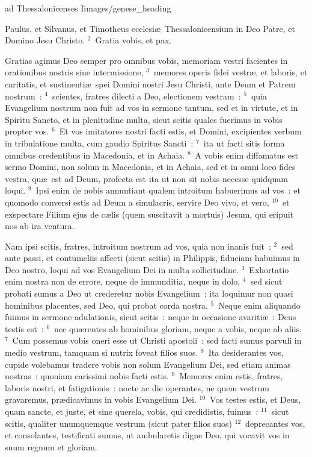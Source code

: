 {ad Thessalonicenses I}{images/genese_heading}


\bchapter
\lettrine[lines=6,image=true,loversize=0.05,lraise=-0.03]{P}{}aulus, et Silvanus, et Timotheus ecclesi\ae\ Thessalonicensium in Deo Patre, et Domino Jesu Christo.
${}^{2}$~Gratia vobis, et pax.

 Gratias agimus Deo semper pro omnibus vobis, memoriam vestri facientes in orationibus nostris sine intermissione,
${}^{3}$~memores operis fidei vestr\ae , et laboris, et caritatis, et sustinenti\ae\ spei Domini nostri Jesu Christi, ante Deum et Patrem nostrum~:
${}^{4}$~scientes, fratres dilecti a Deo, electionem vestram~:
${}^{5}$~quia Evangelium nostrum non fuit ad vos in sermone tantum, sed et in virtute, et in Spiritu Sancto, et in plenitudine multa, sicut scitis quales fuerimus in vobis propter vos.
${}^{6}$~Et vos imitatores nostri facti estis, et Domini, excipientes verbum in tribulatione multa, cum gaudio Spiritus Sancti~:
${}^{7}$~ita ut facti sitis forma omnibus credentibus in Macedonia, et in Achaia.
${}^{8}$~A vobis enim diffamatus est sermo Domini, non solum in Macedonia, et in Achaia, sed et in omni loco fides vestra, qu\ae\ est ad Deum, profecta est ita ut non sit nobis necesse quidquam loqui.
${}^{9}$~Ipsi enim de nobis annuntiant qualem introitum habuerimus ad vos~: et quomodo conversi estis ad Deum a simulacris, servire Deo vivo, et vero,
${}^{10}$~et exspectare Filium ejus de c\ae lis (quem suscitavit a mortuis) Jesum, qui eripuit nos ab ira ventura.

\bchapter
\lettrine[lines=3,image=true,loversize=0.05,lraise=-0.03]{N}{}am ipsi scitis, fratres, introitum nostrum ad vos, quia non inanis fuit~:
${}^{2}$~sed ante passi, et contumeliis affecti (sicut scitis) in Philippis, fiduciam habuimus in Deo nostro, loqui ad vos Evangelium Dei in multa sollicitudine.
${}^{3}$~Exhortatio enim nostra non de errore, neque de immunditia, neque in dolo,
${}^{4}$~sed sicut probati sumus a Deo ut crederetur nobis Evangelium~: ita loquimur non quasi hominibus placentes, sed Deo, qui probat corda nostra.
${}^{5}$~Neque enim aliquando fuimus in sermone adulationis, sicut scitis~: neque in occasione avariti\ae~: Deus testis est~:
${}^{6}$~nec qu\ae rentes ab hominibus gloriam, neque a vobis, neque ab aliis.
${}^{7}$~Cum possemus vobis oneri esse ut Christi apostoli~: sed facti sumus parvuli in medio vestrum, tamquam si nutrix foveat filios suos.
${}^{8}$~Ita desiderantes vos, cupide volebamus tradere vobis non solum Evangelium Dei, sed etiam animas nostras~: quoniam carissimi nobis facti estis.
${}^{9}$~Memores enim estis, fratres, laboris nostri, et fatigationis~: nocte ac die operantes, ne quem vestrum gravaremus, pr\ae dicavimus in vobis Evangelium Dei.
${}^{10}$~Vos testes estis, et Deus, quam sancte, et juste, et sine querela, vobis, qui credidistis, fuimus~:
${}^{11}$~sicut scitis, qualiter unumquemque vestrum (sicut pater filios suos)
${}^{12}$~deprecantes vos, et consolantes, testificati sumus, ut ambularetis digne Deo, qui vocavit vos in suum regnum et gloriam.



